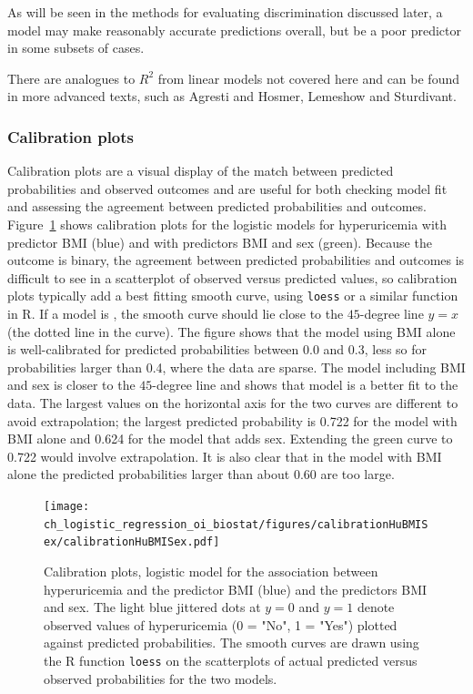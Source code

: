 As will be seen in the methods for evaluating discrimination discussed later,  a model may make reasonably accurate predictions overall, but be a poor predictor in some subsets of cases.

There are analogues to $R^2$ from linear models not covered here and can be found in more advanced texts, such as Agresti and Hosmer, Lemeshow and Sturdivant.


\subsubsection{Calibration plots}

Calibration plots are a visual display of the match between predicted probabilities and observed outcomes and are useful for both checking model fit and assessing the agreement between predicted probabilities and outcomes. Figure~\ref{figure:calibrationHuBMISex} shows calibration plots for the logistic models for hyperuricemia with predictor BMI (blue) and with predictors BMI and sex (green).  Because the outcome is binary, the agreement between predicted probabilities and outcomes is difficult to see in a scatterplot of observed versus predicted values, so calibration plots typically add a best fitting smooth curve, using \texttt{loess} or a similar function in \textsf{R}.  If a model is , the smooth curve should lie close to the $45$-degree line $y = x$ (the dotted line in the curve).  The figure shows that the model using BMI alone is well-calibrated for predicted probabilities between 0.0 and 0.3, less so for probabilities larger than 0.4, where the data are sparse.  The model including BMI and sex is closer to the $45$-degree line and shows that model is a better fit to the data.  The largest values on the horizontal axis for the two curves are different to avoid extrapolation; the largest predicted probability is 0.722 for the model with BMI alone and 0.624 for the model that adds sex.  Extending the green curve to 0.722 would involve extrapolation. It is also clear that in the model with BMI alone the predicted probabilities larger than about $0.60$ are too large. 

\begin{figure}[!tbh]
  \centering
  \texttt{[image: ch\_logistic\_regression\_oi\_biostat/figures/calibrationHuBMISex/calibrationHuBMISex.pdf]}
    \caption{Calibration plots, logistic model for the association between hyperuricemia and the predictor BMI (blue) and the predictors BMI and sex. The light blue jittered dots at  $y = 0$ and $y = 1$ denote observed values of hyperuricemia (0 = "No", 1 = "Yes") plotted against predicted probabilities.   The smooth curves are drawn using the \textsf{R} function \texttt{loess} on the scatterplots of actual predicted versus observed probabilities for the two models.}
   \label{figure:calibrationHuBMISex}
\end{figure}

